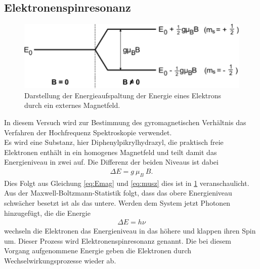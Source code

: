 \subsection{Elektronenspinresonanz}
\begin{figure}[h!]
\centering
\includegraphics[width=\textwidth]{../Grafiken/EnergieAufspaltung.pdf}
\caption{Darstellung der Energieaufspaltung der Energie eines Elektrons durch ein externes Magnetfeld.\cite{V28}}\label{fig:Resonanz}
\end{figure}
In diesem Versuch wird zur Bestimmung des gyromagnetischen Verhältnis das Verfahren der Hochfrequenz Spektroskopie verwendet.\\
Es wird eine Substanz, hier Diphenylpikrylhydrazyl, die praktisch freie Elektronen enthält in ein homogenes Magnetfeld und teilt damit das Energieniveau in zwei auf.
Die Differenz der beiden Niveaus ist dabei 
\begin{align}
	\Delta E = g\ \mu_B \ B.
\end{align}
Dies Folgt aus Gleichung \eqref{eq:Emag} und \eqref{eq:musz} dies ist in \cref{fig:Resonanz} veranschaulicht.
Aus der Maxwell-Boltzmann-Statistik folgt, dass das obere Energieniveau schwächer besetzt ist als das untere.
Werden dem System jetzt Photonen hinzugefügt, die die Energie 
\begin{align}
	\Delta E = h\nu
	\label{eq:energie}
\end{align}
wechseln die Elektronen das Energieniveau in das höhere und klappen ihren Spin um.
Dieser Prozess wird Elektronenspinresonanz genannt.
Die bei diesem Vorgang aufgenommene Energie geben die Elektronen durch Wechselwirkungsprozesse wieder ab. 

{ %

}


